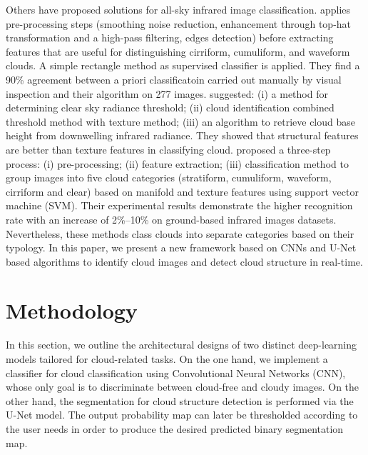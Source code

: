 \documentclass{article}
\begin{document}
Others have proposed solutions for all-sky infrared image classification. \citet{CloudClassificationBasedonStructureFeaturesofInfraredImages} applies pre-processing steps (smoothing noise reduction, enhancement through top-hat transformation and a high-pass filtering, edges detection) before extracting features that are useful for distinguishing cirriform, cumuliform, and waveform clouds. A simple rectangle method as supervised classifier is applied. They find a 90\% agreement between a priori classificatoin carried out manually by visual inspection and their algorithm on 277 images. \citet{SUN2011278} suggested: (i) a method for determining clear sky radiance threshold; (ii) cloud identification combined threshold method with texture method; (iii) an algorithm to retrieve cloud base height from downwelling infrared radiance. They showed that structural features are better than texture features in classifying cloud. \citet{amt-11-5351-2018} proposed a three-step process: (i) pre-processing; (ii) feature extraction; (iii) classification method to group images into five cloud categories (stratiform, cumuliform, waveform, cirriform and clear) based on manifold and texture features using support vector machine (SVM). Their experimental results demonstrate the higher recognition rate with an increase of 2\%–10\% on ground-based infrared images datasets. Nevertheless, these methods class clouds into separate categories based on their typology.
In this paper, we present a new framework based on CNNs and U-Net based algorithms to identify cloud images and detect cloud structure in real-time.



\section{Methodology}

In this section, we outline the architectural designs of two distinct deep-learning models tailored for cloud-related tasks. On the one hand, we implement a classifier for cloud classification using Convolutional Neural Networks (CNN), whose only goal is to discriminate between cloud-free and cloudy images. On the other hand, the segmentation for cloud structure detection is performed via the U-Net model. The output probability map can later be thresholded according to the user needs in order to produce the desired predicted binary segmentation map.
\end{document}
